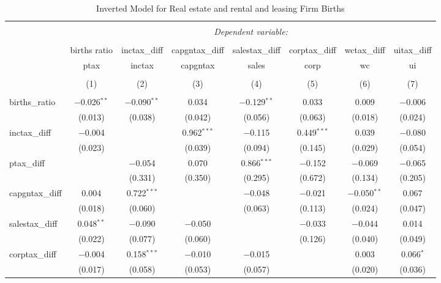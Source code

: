 
\begin{table}[!htbp] \centering 
  \caption{Inverted Model for  Real estate and rental and leasing Firm Births} 
  \label{53rd} 
\footnotesize 
\begin{tabular}{@{\extracolsep{5pt}}lccccccc} 
\\[-1.8ex]\hline 
\hline \\[-1.8ex] 
 & \multicolumn{7}{c}{\textit{Dependent variable:}} \\ 
\cline{2-8} 
\\[-1.8ex] & births ratio & inctax\_diff & capgntax\_diff & salestax\_diff & corptax\_diff & wctax\_diff & uitax\_diff \\ 
 & ptax & inctax & capgntax & sales & corp & wc & ui \\ 
\\[-1.8ex] & (1) & (2) & (3) & (4) & (5) & (6) & (7)\\ 
\hline \\[-1.8ex] 
 births\_ratio & $-$0.026$^{**}$ & $-$0.090$^{**}$ & 0.034 & $-$0.129$^{**}$ & 0.033 & 0.009 & $-$0.006 \\ 
  & (0.013) & (0.038) & (0.042) & (0.056) & (0.063) & (0.018) & (0.024) \\ 
  inctax\_diff & $-$0.004 &  & 0.962$^{***}$ & $-$0.115 & 0.449$^{***}$ & 0.039 & $-$0.080 \\ 
  & (0.023) &  & (0.039) & (0.094) & (0.145) & (0.029) & (0.054) \\ 
  ptax\_diff &  & $-$0.054 & 0.070 & 0.866$^{***}$ & $-$0.152 & $-$0.069 & $-$0.065 \\ 
  &  & (0.331) & (0.350) & (0.295) & (0.672) & (0.134) & (0.205) \\ 
  capgntax\_diff & 0.004 & 0.722$^{***}$ &  & $-$0.048 & $-$0.021 & $-$0.050$^{**}$ & 0.067 \\ 
  & (0.018) & (0.060) &  & (0.063) & (0.113) & (0.024) & (0.047) \\ 
  salestax\_diff & 0.048$^{**}$ & $-$0.090 & $-$0.050 &  & $-$0.033 & $-$0.044 & 0.014 \\ 
  & (0.022) & (0.077) & (0.060) &  & (0.126) & (0.040) & (0.049) \\ 
  corptax\_diff & $-$0.004 & 0.158$^{***}$ & $-$0.010 & $-$0.015 &  & 0.003 & 0.066$^{*}$ \\ 
  & (0.017) & (0.058) & (0.053) & (0.057) &  & (0.020) & (0.036) \\ 

\end{tabular}
\end{table}
